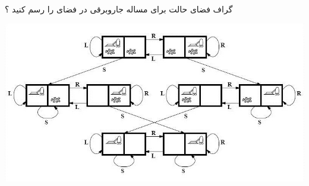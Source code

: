 \documentclass[12pt]{article}
\begin{document}
\newpage

\noindent
گراف فضای حالت برای مساله جاروبرقی در فضای 
	\textbf{}
را رسم کنید ؟


\begin{center}
	\includegraphics[scale=0.8]{./The-state-space-of-the-Vacuum-World-domain.jpg}
\end{center}
\end{document}

